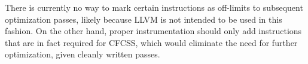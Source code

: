 There is currently no way to mark certain instructions as off-limits to
subsequent optimization passes, likely because LLVM is not intended to be used
in this fashion. On the other hand, proper instrumentation should only add
instructions that are in fact required for CFCSS, which would eliminate the
need for further optimization, given cleanly written passes.



